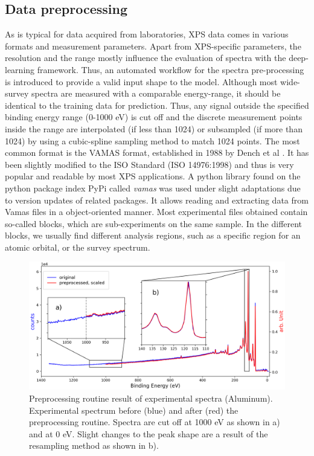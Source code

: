\subsection{Data preprocessing}
\label{testpreprocessing}
As is typical for data acquired from laboratories, XPS data comes in various formats and measurement parameters. Apart from XPS-specific parameters, the resolution and the range mostly influence the evaluation of spectra with the deep-learning framework. Thus, an automated workflow for the spectra pre-processing is introduced to provide a valid input shape to the model.
Although most wide-survey spectra are measured with a comparable energy-range, it should be identical to the training data for prediction. Thus, any signal outside the specified binding energy range (0-1000 eV) is cut off and the discrete measurement points inside the range are interpolated (if less than 1024) or subsampled (if more than 1024) by using a cubic-spline sampling method to match 1024 points. The most common format is the VAMAS format, established in 1988 by Dench et al \cite{dench_vamas_1988}. It has been slightly modified to the ISO Standard \cite{1400-1700_iso_nodate}(ISO 14976:1998) and thus is very popular and readable by most XPS applications. A python library found on the python package index PyPi called \emph{vamas} \cite{krinninger_vamas_nodate} was used under slight adaptations due to version updates of related packages. It allows reading and extracting data from Vamas files in a object-oriented manner.
Most experimental files obtained contain so-called blocks, which are sub-experiments on the same sample. In the different blocks, we usually find different analysis regions, such as a specific region for an atomic orbital, or the survey spectrum.

\begin{figure}
    \centering
    \includegraphics[width=\textwidth]{Figures/preprocessing_routine.png}
    \caption{Preprocessing routine result of experimental spectra (Aluminum). Experimental spectrum before (blue) and after (red) the preprocessing routine. Spectra are cut off at 1000 eV as shown in a) and at 0 eV. Slight changes to the peak shape are a result of the resampling method as shown in b).}
    \label{fig:preproc_routine}
\end{figure}


